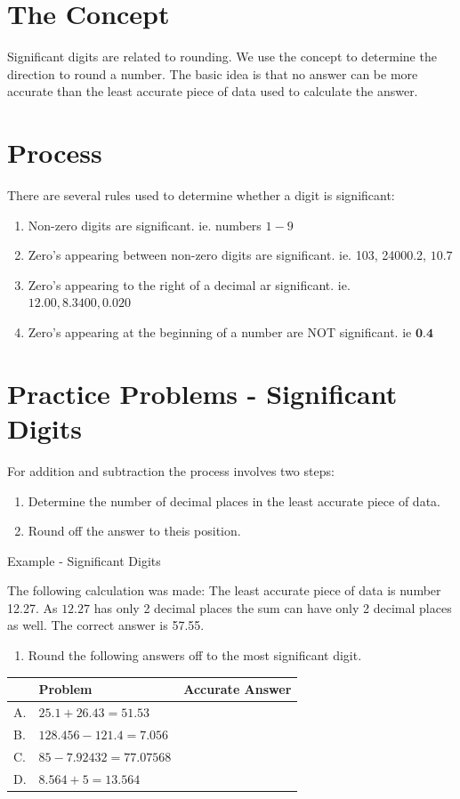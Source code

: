 \documentclass[10pt]{article}
\begin{document}
\section{The Concept}
Significant digits are related to rounding. We use the concept to determine the direction to round a number. The basic idea is that no answer can be more accurate than the least accurate piece of data used to calculate the answer.

\section{Process}
There are several rules used to determine whether a digit is significant:

\begin{enumerate}
  \item Non-zero digits are significant. ie. numbers $1-9$

  \item Zero's appearing between non-zero digits are significant. ie. 103, 24000.2, $10.7$

  \item Zero's appearing to the right of a decimal ar significant. ie. $12.00,8.3400,0.020$

  \item Zero's appearing at the beginning of a number are NOT significant. ie $\mathbf{0 . 4}$

\end{enumerate}
\section{Practice Problems - Significant Digits}
For addition and subtraction the process involves two steps:

\begin{enumerate}
  \item Determine the number of decimal places in the least accurate piece of data.

  \item Round off the answer to theis position.

\end{enumerate}
Example - Significant Digits

The following calculation was made: The least accurate piece of data is number 12.27. As $12.27$ has only 2 decimal places the sum can have only 2 decimal places as well. The correct answer is 57.55.

\begin{enumerate}
  \item Round the following answers off to the most significant digit.
\end{enumerate}
\begin{tabular}{|l|l|l|}
\hline
 & Problem & Accurate Answer \\
\hline
A. & $25.1+26.43=51.53$ &  \\
\hline
B. & $128.456-121.4=7.056$ &  \\
\hline
C. & $85-7.92432=77.07568$ &  \\
\hline
D. & $8.564+5=13.564$ &  \\
\hline
\end{tabular}
\end{document}
